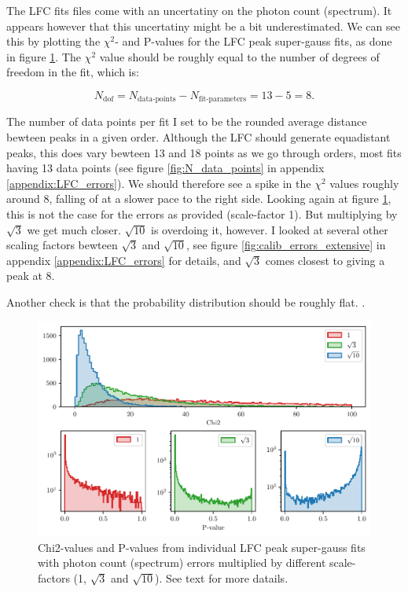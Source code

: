     The LFC fits files come with an uncertatiny on the photon count (spectrum). It appears however that this uncertatiny might be a bit underestimated. We can see this by plotting the $\chi^2$- and P-values for the LFC peak super-gauss fits, as done in figure \ref{fig:calib_errors}. The $\chi^2$ value should be roughly equal to the number of degrees of freedom in the fit, which is: 

    \begin{equation}
        \label{eq:ndof}
        N_\text{dof} = N_\text{data-points} - N_\text{fit-parameters} =  13 - 5 = 8.
    \end{equation}

    The number of data points per fit I set to be the rounded average distance bewteen peaks in a given order. Although the LFC should generate equadistant peaks, this does vary bewteen 13 and 18 points as we go through orders, most fits having 13 data points (see figure \ref{fig:N_data_points} in appendix \ref{appendix:LFC_errors}). We should therefore see a spike in the $\chi^2$ values roughly around 8, falling of at a slower pace to the right side. Looking again at figure \ref{fig:calib_errors}, this is not the case for the errors as provided (scale-factor 1). But multiplying by $\sqrt{3}$ we get much closer. $\sqrt{10}$ is overdoing it, however. I looked at several other scaling factors bewteen $\sqrt{3}$ and $\sqrt{10}$, see figure \ref{fig:calib_errors_extensive} in appendix \ref{appendix:LFC_errors} for details, and $\sqrt{3}$ comes closest to giving a peak at 8.
    
    Another check is that the probability distribution should be roughly flat. .
    
    \begin{figure}%
        \begin{wide}  
            \includegraphics[width=\textwidth]{figures/calib_errors2.pdf}
            \caption{Chi2-values and P-values from individual LFC peak super-gauss fits with photon count (spectrum) errors multiplied by different scale-factors (1, $\sqrt{3}$ and $\sqrt{10}$). See text for more datails.}
        \label{fig:calib_errors}
        \end{wide}
    \end{figure}
    

